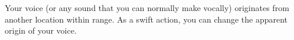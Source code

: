 \begin{spellheader}
    \spellrng{\rngmed}
    \begin{spelltargetinginfo}
    \end{spelltargetinginfo}
    \begin{spelleffects}
    \end{spelleffects}
\end{spellheader}
\begin{spellcontent}
    \spelleffect Your voice (or any sound that you can normally make vocally) originates from another location within range. As a swift action, you can change the apparent origin of your voice.
    \spelldur{\durshort \dismissable}
\end{spellcontent}
\begin{spellfooter}

\end{spellfooter}

\begin{comment}
\spellsection{Vestments of the Mage}{2}
\begin{spellheader}
    \spelldesc{You imbue a set of armor with magical power, preventing it from interfering with your spellcasting.}
    \begin{spelltargetinginfo}
        \spelltwocol{\spelltgt{One nonmagical armor or shield}}{\spellrng{Touch}}
    \end{spelltargetinginfo}
    \begin{spelleffects}
    \end{spelleffects}
\end{spellheader}
\begin{spellcontent}
    \spelleffect The armor or shield's chance of arcane spell failure decreases by 10\% as long as you are wearing or using it. If any other creature wears the armor, it receives no benefit from this spell.
    \spelldur{\durext \dismissable}
\end{spellcontent}
\begin{spellfooter}
    \spellinfo{Transmutation (Imbuement)}{Arcane}
    \spellnotes This decrease is considered an enhancement enhancement bonus.
\end{spellfooter}%
\end{comment}


